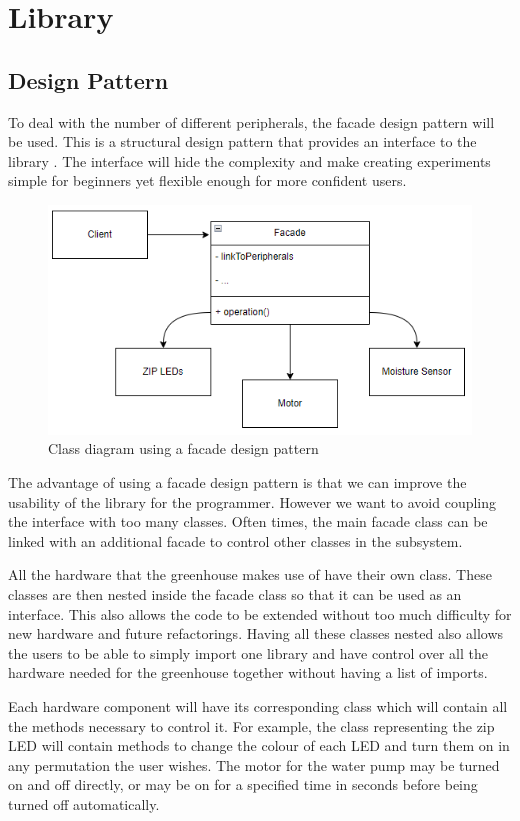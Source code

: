 \section{Library}

\subsection{Design Pattern}

To deal with the number of different peripherals, the facade design pattern will be used. This is a structural design pattern that provides an interface to the library \cite{designPatterns}. The interface will hide the complexity and make creating experiments simple for beginners yet flexible enough for more confident users.

\begin{figure}[ht]
    \centering
    \includegraphics{Report/Images/facadePattern.png}
    \caption{Class diagram using a facade design pattern}
    \label{fig:classDiagram}
\end{figure}

The advantage of using a facade design pattern is that we can improve the usability of the library for the programmer.  However we want to avoid coupling the interface with too many classes. Often times, the main facade class can be linked with an additional facade to control other classes in the subsystem. \cite{designPatterns}

All the hardware that the greenhouse makes use of have their own class. These classes are then nested inside the facade class so that it can be used as an interface. This also allows the code to be extended without too much difficulty for new hardware and future refactorings. Having all these classes nested also allows the users to be able to simply import one library and have control over all the hardware needed for the greenhouse together without having a list of imports.

Each hardware component will have its corresponding class which will contain all the methods necessary to control it. For example, the class representing the zip LED will contain methods to change the colour of each LED and turn them on in any permutation the user wishes. The motor for the water pump may be turned on and off directly, or may be on for a specified time in seconds before being turned off automatically.
